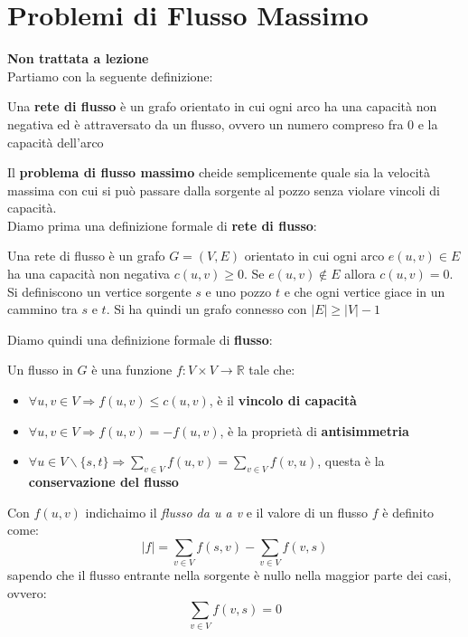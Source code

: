 \documentclass[a4paper,12pt, oneside]{book}
\begin{document}
\chapter{Problemi di Flusso Massimo}
\textbf{Non trattata a lezione}\\
Partiamo con la seguente definizione:
\begin{definizione}
  Una \textbf{rete di flusso} è un grafo orientato in cui ogni arco ha
  una capacità non negativa ed è attraversato da un flusso, ovvero un
  numero compreso fra 0 e la capacità dell'arco
\end{definizione}
Il \textbf{problema di flusso massimo} cheide semplicemente quale sia
la velocità massima con cui si può passare dalla sorgente al pozzo
senza violare vincoli di capacità.\\
Diamo prima una definizione formale di \textbf{rete di flusso}:
\begin{definizione}
  Una rete di flusso è un grafo $G=(V,E)$ orientato in cui ogni arco
  $e(u,v)\in E$ ha una capacità non negativa $c(u,v)\geq 0$. Se
  $e(u,v)\not\in E$ allora $c(u,v)= 0$. Si definiscono un vertice
  sorgente $s$ e uno pozzo $t$ e che ogni vertice giace in un cammino
  tra $s$ e $t$. Si ha quindi un grafo connesso con $|E|\geq |V|-1$
\end{definizione}
Diamo quindi una definizione formale di \textbf{flusso}:
\begin{definizione}
  Un flusso in $G$ è una funzione $f:V\times V\to \mathbb{R}$ tale
  che:
  \begin{itemize}
    \item $\forall u,v\in V \Longrightarrow f(u,v)\leq c(u,v)$, è il
    \textbf{vincolo di capacità}
    \item $\forall u,v\in V \Longrightarrow f(u,v)=- f(u,v)$, è la
    proprietà di \textbf{antisimmetria}
    \item $\forall u\in V\backslash\{s,t\}\Longrightarrow \sum_{v\in V}
    f(u,v)=\sum_{v\in V} f(v,u)$, questa è la \textbf{conservazione
      del flusso} 
  \end{itemize}
  Con $f(u,v)$ indichaimo il \textit{flusso da u a v} e il valore di
  un flusso $f$ è definito come:
  \[|f|=\sum_{v\in V}f(s,v)-\sum_{v\in V}f(v,s)\]
  sapendo che il flusso entrante nella sorgente è nullo nella maggior
  parte dei casi, ovvero:
  \[\sum_{v\in V}f(v,s)=0\]
\end{definizione}
\end{document}
